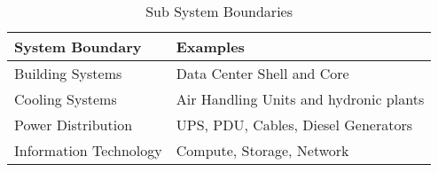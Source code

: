 \begin{table}[h]
\centering
\begin{tabular}{|l|l|} \hline
\bf{System Boundary} & \bf{Examples} \\ \hline 
Building Systems & Data Center Shell and Core \\ \hline
Cooling Systems & Air Handling Units and hydronic plants \\ \hline
Power Distribution & UPS, PDU, Cables, Diesel Generators \\ \hline
Information Technology & Compute, Storage, Network \\
\hline\end{tabular}
\caption{Sub System Boundaries}
\label{tab:dc_subsystem_boundaries}
\end{table}
